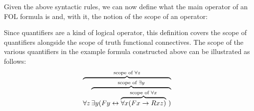
%
%

Given the above syntactic rules, we can now define what the main operator of an FOL formula is and, with it, the notion of the scope of an operator:


Since quantifiers are a kind of logical operator, this definition covers the scope of quantifiers alongside the scope of truth functional connectives.  The scope of the various quantifiers in the example formula constructed above can be illustrated as follows:
$$\overbrace{\forall z\overbrace{\exists y (Fy \leftrightarrow \overbrace{\forall x (Fx \rightarrow Rxz)}^{\text{scope of $\forall x$}}
\ )}^{\text{scope of $\exists y$}}}^{\text{scope of $\forall z$}}$$

